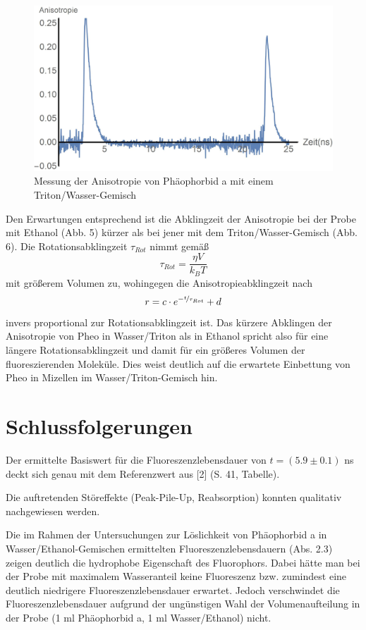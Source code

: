 \documentclass{article}
\begin{document}
\begin{figure}[H]
  \centering
  \includegraphics[width=\textwidth]{Bilder/anisotropie_triton.jpg}
  \caption{Messung der Anisotropie von Phäophorbid a mit einem Triton/Wasser-Gemisch}
\end{figure}


\newpage

Den Erwartungen entsprechend ist die Abklingzeit der Anisotropie bei der Probe mit Ethanol (Abb. 5) kürzer als bei jener mit dem Triton/Wasser-Gemisch (Abb. 6). Die Rotationsabklingzeit $\tau_{Rot}$ nimmt gemäß $$ \tau_{Rot}=\frac{\eta V}{k_B T} $$
mit größerem Volumen zu, wohingegen die Anisotropieabklingzeit nach $$ r= c \cdot e^{-\nicefrac{t}{\tau_{Rot}}}+d $$
invers proportional zur Rotationsabklingzeit ist. Das kürzere Abklingen der Anisotropie von Pheo in Wasser/Triton als in Ethanol spricht also für eine längere Rotationsabklingzeit und damit für ein größeres Volumen der fluoreszierenden Moleküle. Dies weist deutlich auf die erwartete Einbettung von Pheo in Mizellen im Wasser/Triton-Gemisch hin.



\section{Schlussfolgerungen}
Der ermittelte Basiswert für die Fluoreszenzlebensdauer von $t=(5.9 \pm 0.1)$ ns deckt sich genau mit dem Referenzwert aus [2] (S. 41, Tabelle).

Die auftretenden Störeffekte (Peak-Pile-Up, Reabsorption) konnten qualitativ nachgewiesen werden.


Die im Rahmen der Untersuchungen zur Löslichkeit von Phäophorbid a in Wasser/Ethanol-Gemischen ermittelten Fluoreszenzlebensdauern (Abs. 2.3) zeigen deutlich die hydrophobe Eigenschaft des Fluorophors. Dabei hätte man bei der Probe mit maximalem Wasseranteil keine Fluoreszenz bzw. zumindest eine deutlich niedrigere Fluoreszenzlebensdauer erwartet. Jedoch verschwindet die Fluoreszenzlebensdauer aufgrund der ungünstigen Wahl der Volumenaufteilung in der Probe (1 ml Phäophorbid a, 1 ml Wasser/Ethanol) nicht.
\end{document}
